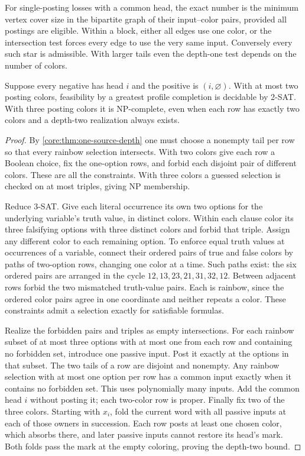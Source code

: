 For single-posting losses with a common head, the exact number is the
minimum vertex cover size in the bipartite graph of their input--color
pairs, provided all postings are eligible. Within a block, either all
edges use one color, or the intersection test forces every edge to use
the very same input. Conversely every such star is admissible. With
larger tails even the depth-one test depends on the number of colors.

\begin{proposition}\label{core:prop:common-head-depth-one}
Suppose every negative has head $i$ and the positive is $(i,\varnothing)$.
With at most two posting colors, feasibility by a greatest profile
completion is decidable by 2-SAT. With three posting colors it is
NP-complete, even when each row has exactly two colors and a
depth-two realization always exists.
\end{proposition}
\begin{proof}
By \cref{core:thm:one-source-depth} one must choose a nonempty
tail per row so that every rainbow selection intersects. With two colors give each row a Boolean choice, fix
the one-option rows, and forbid each disjoint pair of different colors.
These are all the constraints. With three colors a guessed selection
is checked on at most triples, giving NP membership.

Reduce 3-SAT. Give each literal occurrence its own two options for
the underlying variable's truth value, in distinct colors. Within
each clause color its three falsifying options with three distinct
colors and forbid that triple. Assign any different color to each
remaining option. To enforce equal truth values at occurrences of a
variable, connect their ordered pairs of true and false colors by
paths of two-option rows, changing one color at a time. Such paths
exist: the six ordered pairs are arranged in the cycle
$12,13,23,21,31,32,12$. Between adjacent rows forbid the two
mismatched truth-value pairs. Each is rainbow, since the ordered
color pairs agree in one coordinate and neither repeats a color.
These constraints admit a selection exactly for satisfiable formulas.

Realize the forbidden pairs and triples as empty intersections. For
each rainbow subset of at most three options with at most one from
each row and containing no forbidden set, introduce one passive input.
Post it exactly at the options in that subset. The two tails of a
row are disjoint and nonempty. Any rainbow selection with at most
one option per row has a common input exactly when it contains no
forbidden set. This uses polynomially
many inputs. Add the common head $i$ without posting it; each
two-color row is proper. Finally fix two of the three colors.
Starting with $x_i$, fold the current word with all passive inputs
at each of those owners in succession. Each row posts at least one
chosen color, which absorbs there, and later passive inputs cannot
restore its head's mark. Both folds pass the mark at the empty
coloring, proving the depth-two bound.
\end{proof}


